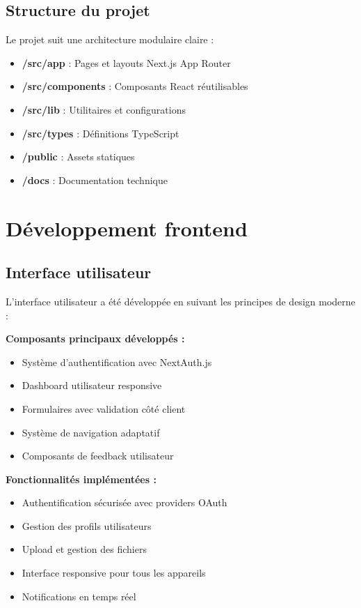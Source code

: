 \subsection{Structure du projet}

Le projet suit une architecture modulaire claire :

\begin{itemize}
    \item \textbf{/src/app} : Pages et layouts Next.js App Router
    \item \textbf{/src/components} : Composants React réutilisables
    \item \textbf{/src/lib} : Utilitaires et configurations
    \item \textbf{/src/types} : Définitions TypeScript
    \item \textbf{/public} : Assets statiques
    \item \textbf{/docs} : Documentation technique
\end{itemize}

\section{Développement frontend}

\subsection{Interface utilisateur}

L'interface utilisateur a été développée en suivant les principes de design moderne :

\textbf{Composants principaux développés :}
\begin{itemize}
    \item Système d'authentification avec NextAuth.js
    \item Dashboard utilisateur responsive
    \item Formulaires avec validation côté client
    \item Système de navigation adaptatif
    \item Composants de feedback utilisateur
\end{itemize}

\textbf{Fonctionnalités implémentées :}
\begin{itemize}
    \item Authentification sécurisée avec providers OAuth
    \item Gestion des profils utilisateurs
    \item Upload et gestion des fichiers
    \item Interface responsive pour tous les appareils
    \item Notifications en temps réel
\end{itemize}

